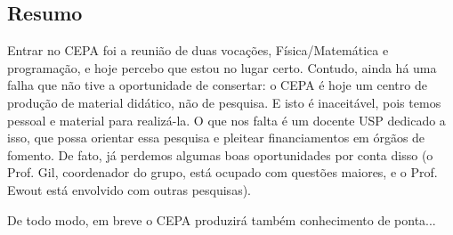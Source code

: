\subsection{Resumo}

Entrar no CEPA foi a reunião de duas vocações, Física/Matemática e programação, e hoje percebo que estou no lugar certo. Contudo, ainda há uma falha que não tive a oportunidade de consertar: o CEPA é hoje um centro de produção de material didático, não de pesquisa. E isto é inaceitável, pois temos pessoal e material para realizá-la. O que nos falta é um docente USP dedicado a isso, que possa orientar essa pesquisa e pleitear financiamentos em órgãos de fomento. De fato, já perdemos algumas boas oportunidades por conta disso (o Prof. Gil, coordenador do grupo, está ocupado com questões maiores, e o Prof. Ewout está envolvido com outras pesquisas).

De todo modo, em breve o CEPA produzirá também conhecimento de ponta...